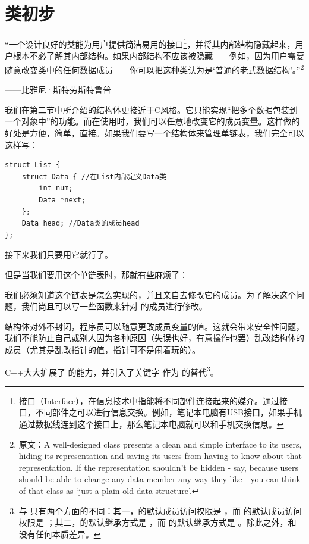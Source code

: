 \section{类初步}
{\large ``一个设计良好的类能为用户提供简洁易用的接口\footnote{接口（Interface），在信息技术中指能将不同部件连接起来的媒介。通过接口，不同部件之可以进行信息交换。例如，笔记本电脑有USB接口，如果手机通过数据线连到这个接口上，那么笔记本电脑就可以和手机交换信息。}，并将其内部结构隐藏起来，用户根本不必了解其内部结构。如果内部结构不应该被隐藏——例如，因为用户需要随意改变类中的任何数据成员——你可以把这种类认为是`普通的老式数据结构'。''\footnote{原文：A well-designed class presents a clean and simple interface to its users, hiding its representation and saving its users from having to know about that representation. If the representation shouldn't be hidden - say, because users should be able to change any data member any way they like - you can think of that class as `just a plain old data structure'.}}
\begin{flushright}——比雅尼·斯特劳斯特鲁普\end{flushright}\par
我们在第二节中所介绍的结构体更接近于C风格。它只能实现``把多个数据包装到一个对象中''的功能。而在使用时，我们可以任意地改变它的成员变量。这样做的好处是方便，简单，直接。如果我们要写一个结构体来管理单链表，我们完全可以这样写：
\begin{lstlisting}
struct List {
    struct Data { //在List内部定义Data类
        int num;
        Data *next;
    };
    Data head; //Data类的成员head
};
\end{lstlisting}
接下来我们只要用它就行了。\par
但是当我们要用这个单链表时，那就有些麻烦了：\par
我们必须知道这个链表是怎么实现的，并且亲自去修改它的成员。为了解决这个问题，我们尚且可以写一些函数来针对 \lstinline@struct@ 的成员进行修改。\par
结构体对外不封闭，程序员可以随意更改成员变量的值。这就会带来安全性问题，我们不能防止自己或别人因为各种原因（失误也好，有意操作也罢）乱改结构体的成员（尤其是乱改指针的值，指针可不是闹着玩的）。\par
C++大大扩展了 \lstinline@struct@ 的能力，并引入了关键字 \lstinline@class@ 作为 \lstinline@struct@ 的替代\footnote{\lstinline@class@ 与 \lstinline@struct@ 只有两个方面的不同：其一，\lstinline@class@ 的默认成员访问权限是 \lstinline@private@，而 \lstinline@struct@ 的默认成员访问权限是 \lstinline@public@；其二，\lstinline@class@ 的默认继承方式是 \lstinline@private@，而 \lstinline@struct@ 的默认继承方式是 \lstinline@public@。除此之外，\lstinline@class@ 和 \lstinline@struct@ 没有任何本质差异。}。\par
